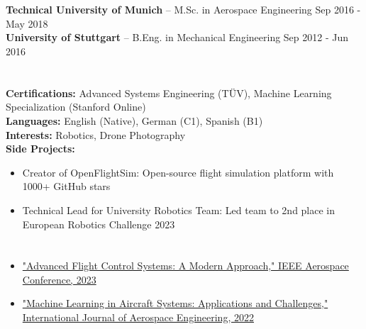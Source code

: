 \documentclass[9pt]{article}        %
\begin{document}
\section*{{\fontsize{12}{14.4}\selectfont{}}{\fontsize{9}{10.8}\selectfont{}}}
\textbf{Technical University of Munich} -- M.Sc. in Aerospace Engineering \hfill Sep 2016 - May 2018 \\
\textbf{University of Stuttgart} -- B.Eng. in Mechanical Engineering \hfill Sep 2012 - Jun 2016

\section*{{\fontsize{12}{14.4}\selectfont{}}{\fontsize{9}{10.8}\selectfont{}}}
\textbf{Certifications:} Advanced Systems Engineering (TÜV), Machine Learning Specialization (Stanford Online) \\
\textbf{Languages:} English (Native), German (C1), Spanish (B1) \\
\textbf{Interests:} Robotics, Drone Photography \\
\textbf{Side Projects:} \\
\vspace{-6 pt}
\begin{itemize}
  \item Creator of OpenFlightSim: Open-source flight simulation platform with 1000+ GitHub stars
  \item Technical Lead for University Robotics Team: Led team to 2nd place in European Robotics Challenge 2023
\end{itemize}

\section*{{\fontsize{12}{14.4}\selectfont{}}{\fontsize{9}{10.8}\selectfont{}}}
\begin{itemize}
  \item \href{https://example.com/paper1}{"Advanced Flight Control Systems: A Modern Approach," IEEE Aerospace Conference, 2023}
  \item \href{https://example.com/paper2}{"Machine Learning in Aircraft Systems: Applications and Challenges," International Journal of Aerospace Engineering, 2022}
\end{itemize}
\end{document}
